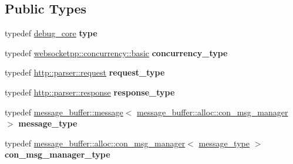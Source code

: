 \subsection*{Public Types}
\begin{DoxyCompactItemize}
\item 
typedef \hyperlink{structwebsocketpp_1_1config_1_1debug__core}{debug\+\_\+core} {\bfseries type}\hypertarget{structwebsocketpp_1_1config_1_1debug__core_a5c32a974103fef0bad45f0f66bf20e8e}{}\label{structwebsocketpp_1_1config_1_1debug__core_a5c32a974103fef0bad45f0f66bf20e8e}

\item 
typedef \hyperlink{classwebsocketpp_1_1concurrency_1_1basic}{websocketpp\+::concurrency\+::basic} {\bfseries concurrency\+\_\+type}\hypertarget{structwebsocketpp_1_1config_1_1debug__core_aada73b9183fc032c25178870dbb4d83d}{}\label{structwebsocketpp_1_1config_1_1debug__core_aada73b9183fc032c25178870dbb4d83d}

\item 
typedef \hyperlink{classwebsocketpp_1_1http_1_1parser_1_1request}{http\+::parser\+::request} {\bfseries request\+\_\+type}\hypertarget{structwebsocketpp_1_1config_1_1debug__core_a597de872d5a5b6e9bd2fa1af18ccbbc6}{}\label{structwebsocketpp_1_1config_1_1debug__core_a597de872d5a5b6e9bd2fa1af18ccbbc6}

\item 
typedef \hyperlink{classwebsocketpp_1_1http_1_1parser_1_1response}{http\+::parser\+::response} {\bfseries response\+\_\+type}\hypertarget{structwebsocketpp_1_1config_1_1debug__core_aa11255cb23f43afb8884bc464aa5c572}{}\label{structwebsocketpp_1_1config_1_1debug__core_aa11255cb23f43afb8884bc464aa5c572}

\item 
typedef \hyperlink{classwebsocketpp_1_1message__buffer_1_1message}{message\+\_\+buffer\+::message}$<$ \hyperlink{classwebsocketpp_1_1message__buffer_1_1alloc_1_1con__msg__manager}{message\+\_\+buffer\+::alloc\+::con\+\_\+msg\+\_\+manager} $>$ {\bfseries message\+\_\+type}\hypertarget{structwebsocketpp_1_1config_1_1debug__core_ac17c81ad59c265eed87e3e25944c9fbf}{}\label{structwebsocketpp_1_1config_1_1debug__core_ac17c81ad59c265eed87e3e25944c9fbf}

\item 
typedef \hyperlink{classwebsocketpp_1_1message__buffer_1_1alloc_1_1con__msg__manager}{message\+\_\+buffer\+::alloc\+::con\+\_\+msg\+\_\+manager}$<$ \hyperlink{classwebsocketpp_1_1message__buffer_1_1message}{message\+\_\+type} $>$ {\bfseries con\+\_\+msg\+\_\+manager\+\_\+type}\hypertarget{structwebsocketpp_1_1config_1_1debug__core_a7054f79ccb00e2269e3c9fa1061126ac}{}\label{structwebsocketpp_1_1config_1_1debug__core_a7054f79ccb00e2269e3c9fa1061126ac}


\end{DoxyCompactItemize}
